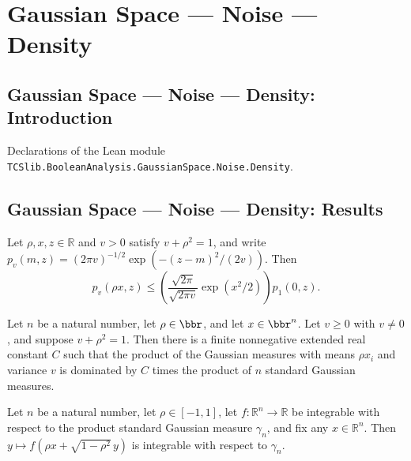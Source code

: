 \section{Gaussian Space --- Noise --- Density}
\subsection*{Gaussian Space --- Noise --- Density: Introduction}

Declarations of the Lean module \texttt{TCSlib.BooleanAnalysis.GaussianSpace.Noise.Density}.

\subsection*{Gaussian Space --- Noise --- Density: Results}

\begin{lemma}
\label{BooleanAnalysis.GaussianSpace.gaussianPDFReal_noise_le}
\leanok
{}
Let $\rho,x,z\in\mathbb R$ and $v>0$ satisfy $v+\rho^2=1$, and write $p_v(m,z)=(2\pi
v)^{-1/2}\exp(-(z-m)^2/(2v))$. Then
\[p_v(\rho x,z)\le\left(\frac{\sqrt{2\pi}}{\sqrt{2\pi v}}\exp(x^2/2)\right)p_1(0,z).\]
\end{lemma}

\begin{lemma}
\label{BooleanAnalysis.GaussianSpace.pi_gaussianNoise_le_smul}
\leanok
{}
Let $n$ be a natural number, let $\rho\in\bbr$, and let $x\in\bbr^n$. Let $v\ge0$ with
$v\ne0$, and suppose $v+\rho^2=1$. Then there is a finite nonnegative extended real
constant $C$ such that the product of the Gaussian measures with means $\rho x_i$ and
variance $v$ is dominated by $C$ times the product of $n$ standard Gaussian measures.
\end{lemma}

\begin{lemma}
\label{BooleanAnalysis.GaussianSpace.integrable_gaussianNoise_integrand}
\leanok
{}
Let $n$ be a natural number, let $\rho\in[-1,1]$, let $f:\mathbb R^n\to\mathbb R$ be
integrable with respect to the product standard Gaussian measure $\gamma_n$, and fix any
$x\in\mathbb R^n$. Then $y\mapsto f(\rho x+\sqrt{1-\rho^2}\,y)$ is integrable with
respect to $\gamma_n$.
\end{lemma}

